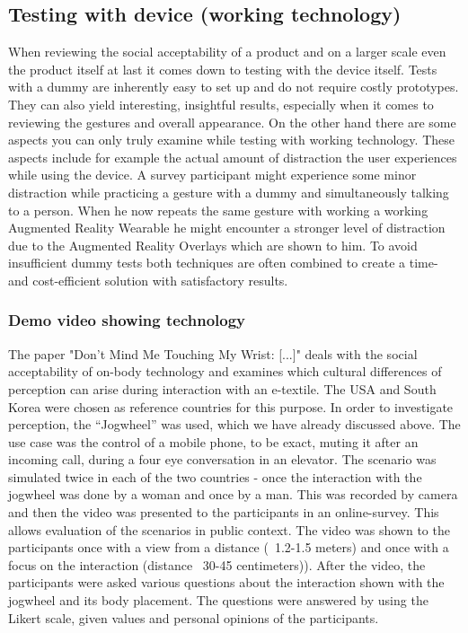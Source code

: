 \documentclass{sigchi}
\begin{document}
\subsection{Testing with device (working technology)}
When reviewing the social acceptability of a product and on a larger scale even the product itself at last it comes down to testing with the device itself. Tests with a dummy are inherently easy to set up and do not require costly prototypes. They can also yield interesting, insightful results, especially when it comes to reviewing the gestures and overall appearance. On the other hand there are some aspects you can only truly examine while testing with working technology. These aspects include for example the actual amount of distraction the user experiences while using the device. A survey participant might experience some minor distraction while practicing a gesture with a dummy and simultaneously talking to a person. When he now repeats the same gesture with working a working Augmented Reality Wearable he might encounter a stronger level of distraction due to the Augmented Reality Overlays which are shown to him.
To avoid insufficient dummy tests both techniques are often combined to create a time- and cost-efficient solution with satisfactory results.

\subsubsection{Demo video showing technology}
The paper "Don't Mind Me Touching My Wrist: [...]"\cite{touch-wrist} deals with the social acceptability of on-body technology and examines which cultural differences of perception can arise during interaction with an e-textile. \cite{touch-wrist} The USA and South Korea were chosen as reference countries for this purpose. In order to investigate perception, the “Jogwheel” was used, which we have already discussed above. The use case was the control of a mobile phone, to be exact, muting it after an incoming call, during a four eye conversation in an elevator. The scenario was simulated twice in each of the two countries - once the interaction with the jogwheel was done by a woman and once by a man. This was recorded by camera and then the video was presented to the participants in an online-survey. This allows evaluation of the scenarios in public context. The video was shown to the participants once with a view from a distance (~1.2-1.5 meters) and once with a focus on the interaction (distance ~30-45 centimeters)). After the video, the participants were asked various questions about the interaction shown with the jogwheel and its body placement. The questions were answered by using the Likert scale, given values and personal opinions of the participants. \cite{touch-wrist}
\end{document}
